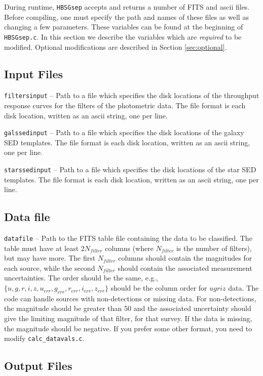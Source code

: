 \documentclass[12pt,preprint]{aastex}
\begin{document}
During runtime, {\tt HBSGsep} accepts and returns a number of FITS and ascii files.  
Before compiling, one must specify the path and names of these files as well as 
changing a few parameters.  These variables can be found at the beginning of 
{\tt HBSGsep.c}.  In this section we describe the variables which are \emph{required} 
to be modified.  Optional modifications are described in Section \ref{sec:optional}.

\subsection{Input Files}

{\tt filtersinput} -- Path to a file which specifies the disk locations of the throughput 
response curves for the filters of the photometric data.  The file format is each 
disk location, written as an ascii string, one per line.

{\tt galssedinput} -- Path to a file which specifies the disk locations of the galaxy SED 
templates.  The file format is each disk location, written as an ascii string, one per line.

{\tt starssedinput} -- Path to a file which specifies the disk locations of the star SED 
templates.  The file format is each disk location, written as an ascii string, one per line.

\subsection{Data file}

{\tt datafile} -- Path to the FITS table file containing the data to be classified.  The table 
must have at least 2$N_{filter}$ columns (where $N_{filter}$ is the number of filters), but may have 
more.  The first $N_{filter}$ columns should contain the magnitudes for each source, while 
the second $N_{filter}$ should contain the associated measurement uncertainties.  The order 
should be the same, e.g., $\{u,g,r,i,z,u_{err},g_{err},r_{err},i_{err},z_{err}\}$ should be the 
column order for $ugriz$ data.  The code can handle sources with non-detections or 
missing data.  For non-detections, the magnitude should be greater than 50 and the 
associated uncertainty should give the limiting magnitude of that filter, for that survey.  
If the data is missing, the magnitude should be negative.  If you prefer some other 
format, you need to modify {\tt calc\_datavals.c}.

\subsection{Output Files}
\end{document}
